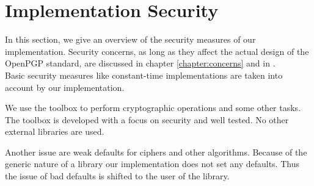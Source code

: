 \newpage

\section{Implementation Security}
In this section, we give an overview of the security measures of our implementation. 
Security concerns, as long as they affect the actual design of the OpenPGP standard, are discussed in chapter \ref{chapter:concerns} and in \cite[section 14]{RFC4880}.  \\

Basic security measures like constant-time implementations are taken into account by our implementation. 

We use the  toolbox to perform cryptographic operations and some other tasks. The toolbox is developed with a focus on security and well tested. No other external libraries are used. 

Another issue are weak defaults for ciphers and other algorithms. Because of the generic nature of a library our implementation does not set any defaults. Thus the issue of bad defaults is shifted to the user of the library. \\







